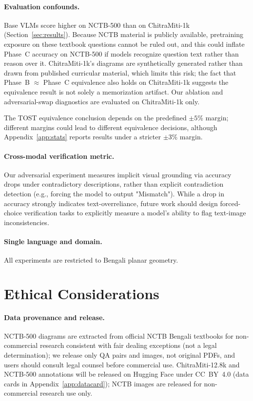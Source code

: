 \documentclass[11pt]{article}
\begin{document}
\paragraph{Evaluation confounds.} Base VLMs score higher on NCTB-500 than on ChitraMiti-1k (Section~\ref{sec:results}). Because NCTB material is publicly available, pretraining exposure on these textbook questions cannot be ruled out, and this could inflate Phase~C accuracy on NCTB-500 if models recognize question text rather than reason over it. ChitraMiti-1k's diagrams are synthetically generated rather than drawn from published curricular material, which limits this risk; the fact that Phase~B $\approx$ Phase~C equivalence also holds on ChitraMiti-1k suggests the equivalence result is not solely a memorization artifact. Our ablation and adversarial-swap diagnostics are evaluated on ChitraMiti-1k only.

The TOST equivalence conclusion depends on the predefined $\pm 5$\% margin; different margins could lead to different equivalence decisions, although Appendix~\ref{app:stats} reports results under a stricter $\pm 3$\% margin.

\paragraph{Cross-modal verification metric.} Our adversarial experiment measures implicit visual grounding via accuracy drops under contradictory descriptions, rather than explicit contradiction detection (e.g., forcing the model to output "Mismatch"). While a drop in accuracy strongly indicates text-overreliance, future work should design forced-choice verification tasks to explicitly measure a model's ability to flag text-image inconsistencies.

\paragraph{Single language and domain.} All experiments are restricted to Bengali planar geometry.

\section*{Ethical Considerations}
\label{sec:ethics}

\paragraph{Data provenance and release.} NCTB-500 diagrams are extracted from official NCTB Bengali textbooks for non-commercial research consistent with fair dealing exceptions (not a legal determination); we release only QA pairs and images, not original PDFs, and users should consult legal counsel before commercial use. ChitraMiti-12.8k and NCTB-500 annotations will be released on Hugging Face under CC~BY~4.0 (data cards in Appendix~\ref{app:datacard}); NCTB images are released for non-commercial research use only.
\end{document}
